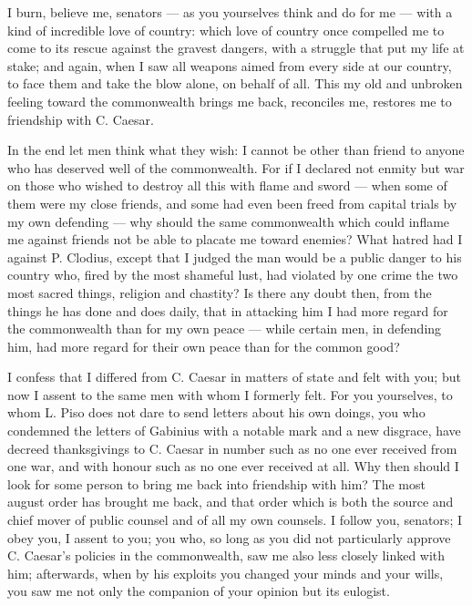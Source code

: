  I burn, believe me, senators --- as you yourselves think and do for me --- with a kind of incredible love of country: which love of country once compelled me to come to its rescue against the gravest dangers, with a struggle that put my life at stake; and again, when I saw all weapons aimed from every side at our country, to face them and take the blow alone, on behalf of all. This my old and unbroken feeling toward the commonwealth brings me back, reconciles me, restores me to friendship with C. Caesar.

 In the end let men think what they wish: I cannot be other than friend to anyone who has deserved well of the commonwealth. For if I declared not enmity but war on those who wished to destroy all this with flame and sword --- when some of them were my close friends, and some had even been freed from capital trials by my own defending --- why should the same commonwealth which could inflame me against friends not be able to placate me toward enemies? What hatred had I against P. Clodius, except that I judged the man would be a public danger to his country who, fired by the most shameful lust, had violated by one crime the two most sacred things, religion and chastity? Is there any doubt then, from the things he has done and does daily, that in attacking him I had more regard for the commonwealth than for my own peace --- while certain men, in defending him, had more regard for their own peace than for the common good?

 I confess that I differed from C. Caesar in matters of state and felt with you; but now I assent to the same men with whom I formerly felt. For you yourselves, to whom L. Piso does not dare to send letters about his own doings, you who condemned the letters of Gabinius with a notable mark and a new disgrace, have decreed thanksgivings to C. Caesar in number such as no one ever received from one war, and with honour such as no one ever received at all. Why then should I look for some person to bring me back into friendship with him? The most august order has brought me back, and that order which is both the source and chief mover of public counsel and of all my own counsels. I follow you, senators; I obey you, I assent to you; you who, so long as you did not particularly approve C. Caesar's policies in the commonwealth, saw me also less closely linked with him; afterwards, when by his exploits you changed your minds and your wills, you saw me not only the companion of your opinion but its eulogist.

